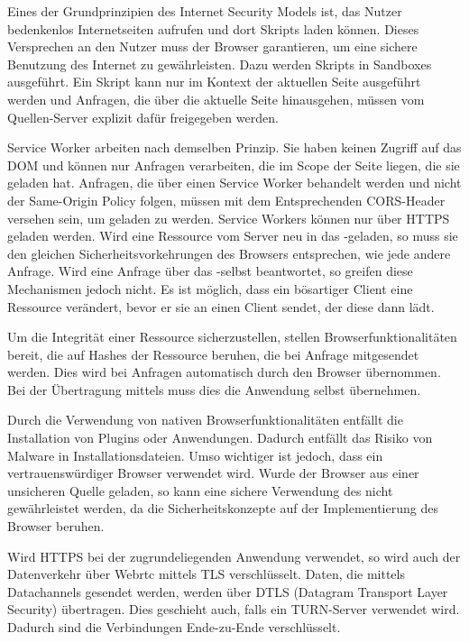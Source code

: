 Eines der Grundprinzipien des Internet Security Models ist, das Nutzer bedenkenlos Internetseiten aufrufen und dort Skripts laden können.\cite{huang_chen} Dieses Versprechen an den Nutzer muss der Browser garantieren, um eine sichere Benutzung des Internet zu gewährleisten. Dazu werden Skripts in Sandboxes ausgeführt.\cite{chrome_sandbox} Ein Skript kann nur im Kontext der aktuellen Seite ausgeführt werden und Anfragen, die über die aktuelle Seite hinausgehen, müssen vom Quellen-Server explizit dafür freigegeben werden.\cite{cors_std} 

Service Worker arbeiten nach demselben Prinzip. Sie haben keinen Zugriff auf das DOM und können nur Anfragen verarbeiten, die im Scope der Seite liegen, die sie geladen hat.\cite{moz_sw} Anfragen, die über einen Service Worker behandelt werden und nicht der Same-Origin Policy folgen, müssen mit dem Entsprechenden CORS-Header versehen sein, um geladen zu werden. Service Workers können nur über HTTPS geladen werden. Wird eine Ressource vom Server neu in das \pTp-\cdn geladen, so muss sie den gleichen Sicherheitsvorkehrungen des Browsers entsprechen, wie jede andere Anfrage. Wird eine Anfrage über das \pTp-\cdn selbst beantwortet, so greifen diese Mechanismen jedoch nicht. Es ist möglich, dass ein bösartiger Client eine Ressource verändert, bevor er sie an einen Client sendet, der diese dann lädt. 

Um die Integrität einer Ressource sicherzustellen, stellen Browserfunktionalitäten bereit, die auf Hashes der Ressource beruhen, die bei Anfrage mitgesendet werden.\cite{sub_res_integrity} Dies wird bei Anfragen automatisch durch den Browser übernommen. Bei der Übertragung mittels \webrtc muss dies die Anwendung selbst übernehmen.  

Durch die Verwendung von nativen Browserfunktionalitäten entfällt die Installation von Plugins oder Anwendungen. Dadurch entfällt das Risiko von Malware in Installationsdateien. Umso wichtiger ist jedoch, dass ein vertrauenswürdiger Browser verwendet wird. Wurde der Browser aus einer unsicheren Quelle geladen, so kann eine sichere Verwendung des \cdns nicht gewährleistet werden, da die Sicherheitskonzepte auf der Implementierung des Browser beruhen.\cite{webrtc-security}

Wird HTTPS bei der zugrundeliegenden Anwendung verwendet, so wird auch der Datenverkehr über Webrtc mittels TLS verschlüsselt.\cite{rtcweb-security} Daten, die mittels \webrtc Datachannels gesendet werden, werden über DTLS (Datagram Transport Layer Security) übertragen. Dies geschieht auch, falls ein TURN-Server verwendet wird. Dadurch sind die Verbindungen Ende-zu-Ende verschlüsselt.

